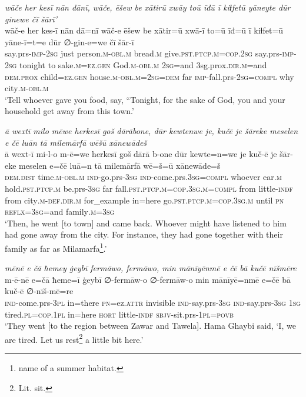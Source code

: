 \ea \label{BP.165}
\textit{wāče her kesī nān dānī, wāče, ēšew be xātirū xwāy toū īđū ī kiɫfetū yāneyte dūr ginewe čī šārī’} \\ 
\gll wāč-e her kes-ī nān dā=nī wāč-e ēšew be xātir=ū xwā-ī to=ū īđ=ū ī kiɫfet=ū yāne-ī=t=e dūr ∅-gin-e=we čī šār-ī \\ 
 say.prs-\textsc{imp-}\textsc{2sg} just person\textsc{.m}\textsc{-obl}\textsc{.m} bread\textsc{.m} give\textsc{.pst}\textsc{.ptcp}\textsc{.m}\textsc{=cop}\textsc{.\textsc{2sg}} say.prs-\textsc{imp-}\textsc{2sg} tonight to sake\textsc{.m}\textsc{=ez.gen} God\textsc{.m}\textsc{-obl}\textsc{.m} \textsc{2sg}=and 3sg.prox\textsc{.dir}\textsc{.m}=and \textsc{dem.prox} child\textsc{=ez.gen} house\textsc{.m}\textsc{-obl}\textsc{.m}\textsc{=\textsc{2sg}}\textsc{=dem} far \textsc{imp-}fall.prs-\textsc{2sg}\textsc{=compl} why city\textsc{.m}\textsc{-obl}\textsc{.m} \\ 
\glt `Tell whoever gave you food, say, “Tonight, for the sake of God, you and your household get away from this town.'
\z 
 
\ea \label{BP.167}
\textit{ā wextī milo mēwe herkesī goš dārābone, dūr kewtenwe je, kučē je šāreke meselen e čē luān tā milemārfā wēšū xānewādeš} \\ 
\gll ā wext-ī mi-l-o m-ē=we herkesī goš dārā b-one dūr kewte=n=we je kuč-ē je šār-eke meselen e=čē luā=n tā milemārfā wē=š=ū xānewāde=š \\ 
 \textsc{dem.dist} time\textsc{.m}\textsc{-obl}\textsc{.m} \textsc{ind-}go.prs\textsc{-3sg} \textsc{ind-}come.prs\textsc{.3sg}\textsc{=compl} whoever ear\textsc{.m} hold\textsc{.pst}\textsc{.ptcp}\textsc{.m} be.prs\textsc{-3sg} far fall\textsc{.pst}\textsc{.ptcp}\textsc{.m}\textsc{=cop}\textsc{.3sg}\textsc{.m}\textsc{=compl} from little\textsc{-indf} from city\textsc{.m}\textsc{-def}\textsc{.dir}\textsc{.m} for\_example in=here go\textsc{.pst}\textsc{.ptcp}\textsc{.m}\textsc{=cop}\textsc{.3sg}\textsc{.m} until \textsc{pn} \textsc{reflx}\textsc{=3sg}=and family\textsc{.m}\textsc{=3sg} \\ 
\glt `Then, he went [to town] and came back. Whoever might have listened to him had gone away from the city. For instance, they had gone together with their family as far as Milamarfa\footnote{name of a summer habitat.}.'
\z 
 
\ea \label{BP.181}
\textit{mēnē e čā ħemey ġeybī fermāwo, fermāwo, min mānīyēnmē e čē bā kučē nīšmēre} \\ 
\gll m-ē-nē e=čā ħeme=ī ġeybī ∅-fermāw-o ∅-fermāw-o min mānīyē=nmē e=čē bā kuč-ē ∅-nīš-mē=re \\ 
 \textsc{ind-}come.prs\textsc{-3pl} in=there \textsc{pn}=ez.\textsc{attr} invisible \textsc{ind-}say.prs\textsc{-3sg} \textsc{ind-}say.prs\textsc{-3sg} \textsc{1sg} tired\textsc{.pl}\textsc{=cop}\textsc{.\textsc{1pl}} in=here \textsc{hort} little\textsc{-indf} \textsc{sbjv-}sit.prs\textsc{-\textsc{1pl}}\textsc{=\textsc{povb}} \\ 
\glt `They went [to the region between Zawar and Tawela]. Hama Ghaybi said, ‘I, we are tired. Let us rest\footnote{Lit. sit.} a little bit here.'
\z 
 
